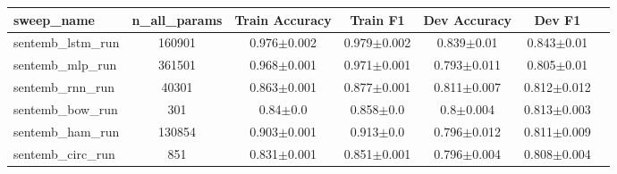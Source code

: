 \begin{tabular}{lcccccc}
\toprule
sweep_name & n_all_params & Train Accuracy & Train F1 & Dev Accuracy & Dev F1 \\
\midrule
sentemb_lstm_run & 160901 & 0.976$\pm$0.002 & 0.979$\pm$0.002 & 0.839$\pm$0.01 & 0.843$\pm$0.01 \\
sentemb_mlp_run & 361501 & 0.968$\pm$0.001 & 0.971$\pm$0.001 & 0.793$\pm$0.011 & 0.805$\pm$0.01 \\
sentemb_rnn_run & 40301 & 0.863$\pm$0.001 & 0.877$\pm$0.001 & 0.811$\pm$0.007 & 0.812$\pm$0.012 \\
sentemb_bow_run & 301 & 0.84$\pm$0.0 & 0.858$\pm$0.0 & 0.8$\pm$0.004 & 0.813$\pm$0.003 \\
sentemb_ham_run & 130854 & 0.903$\pm$0.001 & 0.913$\pm$0.0 & 0.796$\pm$0.012 & 0.811$\pm$0.009 \\
sentemb_circ_run & 851 & 0.831$\pm$0.001 & 0.851$\pm$0.001 & 0.796$\pm$0.004 & 0.808$\pm$0.004 \\
\bottomrule
\end{tabular}
